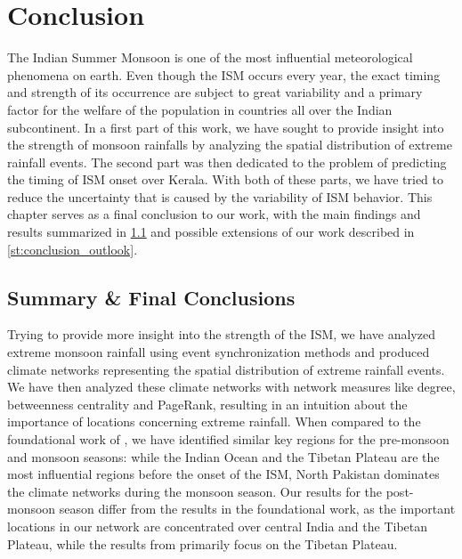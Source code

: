\chapter{Conclusion}
\label{c:conclusion}
The Indian Summer Monsoon is one of the most influential meteorological phenomena on earth. Even though the ISM occurs every year, the exact timing and strength of its occurrence are subject to great variability and a primary factor for the welfare of the population in countries all over the Indian subcontinent. In a first part of this work, we have sought to provide insight into the strength of monsoon rainfalls by analyzing the spatial distribution of extreme rainfall events. The second part was then dedicated to the problem of predicting the timing of ISM onset over Kerala. With both of these parts, we have tried to reduce the uncertainty that is caused by the variability of ISM behavior. This chapter serves as a final conclusion to our work, with the main findings and results summarized in \cref{st:conclusion_summary} and possible extensions of our work described in \cref{st:conclusion_outlook}.

\section{Summary \& Final Conclusions}
\label{st:conclusion_summary}
Trying to provide more insight into the strength of the ISM, we have analyzed extreme monsoon rainfall using event synchronization methods and produced climate networks representing the spatial distribution of extreme rainfall events. We have then analyzed these climate networks with network measures like degree, betweenness centrality and PageRank, resulting in an intuition about the importance of locations concerning extreme rainfall. When compared to the foundational work of \citet{Stolbova.2015}, we have identified similar key regions for the pre-monsoon and monsoon seasons: while the Indian Ocean and the Tibetan Plateau are the most influential regions before the onset of the ISM, North Pakistan dominates the climate networks during the monsoon season. Our results for the post-monsoon season differ from the results in the foundational work, as the important locations in our network are concentrated over central India and the Tibetan Plateau, while the results from \citet{Stolbova.2015} primarily focus on the Tibetan Plateau.

